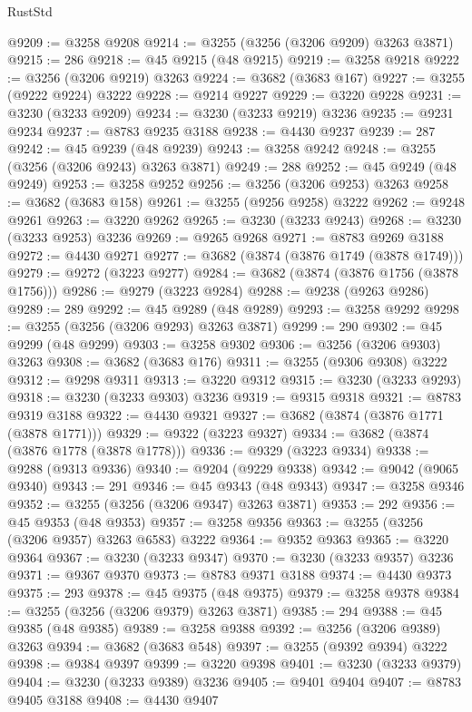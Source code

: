 \begin{lexlean}{RustStd}
\begin{coremodule}
{\begin{coremodule}
{{{{{{{{{{{{{{{{{{{{{{{{{{{{{{{{{{{{{@9209 := @3258 @9208
@9214 := @3255 (@3256 (@3206 @9209) @3263 @3871)
@9215 := 286
@9218 := @45 @9215 (@48 @9215)
@9219 := @3258 @9218
@9222 := @3256 (@3206 @9219) @3263
@9224 := @3682 (@3683 @167)
@9227 := @3255 (@9222 @9224) @3222
@9228 := @9214 @9227
@9229 := @3220 @9228
@9231 := @3230 (@3233 @9209)
@9234 := @3230 (@3233 @9219) @3236
@9235 := @9231 @9234
@9237 := @8783 @9235 @3188
@9238 := @4430 @9237
@9239 := 287
@9242 := @45 @9239 (@48 @9239)
@9243 := @3258 @9242
@9248 := @3255 (@3256 (@3206 @9243) @3263 @3871)
@9249 := 288
@9252 := @45 @9249 (@48 @9249)
@9253 := @3258 @9252
@9256 := @3256 (@3206 @9253) @3263
@9258 := @3682 (@3683 @158)
@9261 := @3255 (@9256 @9258) @3222
@9262 := @9248 @9261
@9263 := @3220 @9262
@9265 := @3230 (@3233 @9243)
@9268 := @3230 (@3233 @9253) @3236
@9269 := @9265 @9268
@9271 := @8783 @9269 @3188
@9272 := @4430 @9271
@9277 := @3682 (@3874 (@3876 @1749 (@3878 @1749)))
@9279 := @9272 (@3223 @9277)
@9284 := @3682 (@3874 (@3876 @1756 (@3878 @1756)))
@9286 := @9279 (@3223 @9284)
@9288 := @9238 (@9263 @9286)
@9289 := 289
@9292 := @45 @9289 (@48 @9289)
@9293 := @3258 @9292
@9298 := @3255 (@3256 (@3206 @9293) @3263 @3871)
@9299 := 290
@9302 := @45 @9299 (@48 @9299)
@9303 := @3258 @9302
@9306 := @3256 (@3206 @9303) @3263
@9308 := @3682 (@3683 @176)
@9311 := @3255 (@9306 @9308) @3222
@9312 := @9298 @9311
@9313 := @3220 @9312
@9315 := @3230 (@3233 @9293)
@9318 := @3230 (@3233 @9303) @3236
@9319 := @9315 @9318
@9321 := @8783 @9319 @3188
@9322 := @4430 @9321
@9327 := @3682 (@3874 (@3876 @1771 (@3878 @1771)))
@9329 := @9322 (@3223 @9327)
@9334 := @3682 (@3874 (@3876 @1778 (@3878 @1778)))
@9336 := @9329 (@3223 @9334)
@9338 := @9288 (@9313 @9336)
@9340 := @9204 (@9229 @9338)
@9342 := @9042 (@9065 @9340)
@9343 := 291
@9346 := @45 @9343 (@48 @9343)
@9347 := @3258 @9346
@9352 := @3255 (@3256 (@3206 @9347) @3263 @3871)
@9353 := 292
@9356 := @45 @9353 (@48 @9353)
@9357 := @3258 @9356
@9363 := @3255 (@3256 (@3206 @9357) @3263 @6583) @3222
@9364 := @9352 @9363
@9365 := @3220 @9364
@9367 := @3230 (@3233 @9347)
@9370 := @3230 (@3233 @9357) @3236
@9371 := @9367 @9370
@9373 := @8783 @9371 @3188
@9374 := @4430 @9373
@9375 := 293
@9378 := @45 @9375 (@48 @9375)
@9379 := @3258 @9378
@9384 := @3255 (@3256 (@3206 @9379) @3263 @3871)
@9385 := 294
@9388 := @45 @9385 (@48 @9385)
@9389 := @3258 @9388
@9392 := @3256 (@3206 @9389) @3263
@9394 := @3682 (@3683 @548)
@9397 := @3255 (@9392 @9394) @3222
@9398 := @9384 @9397
@9399 := @3220 @9398
@9401 := @3230 (@3233 @9379)
@9404 := @3230 (@3233 @9389) @3236
@9405 := @9401 @9404
@9407 := @8783 @9405 @3188
@9408 := @4430 @9407
}}}}}}}}}}}}}}}}}}}}}}}}}}}}}}}}}}}}}
\end{coremodule}}
\end{coremodule}
\end{lexlean}
